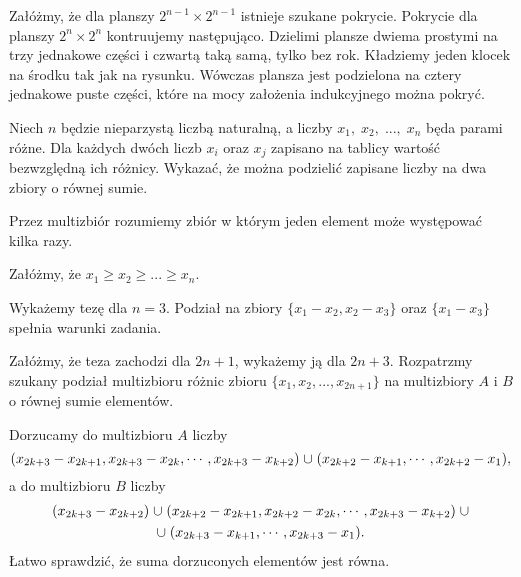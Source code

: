 Załóżmy, że dla planszy $2^{n - 1} \times 2^{n - 1}$ istnieje szukane pokrycie. Pokrycie dla planszy $2^{n} \times 2^{n}$ kontruujemy następująco. Dzielimi plansze dwiema prostymi na trzy jednakowe części i czwartą taką samą, tylko bez rok. Kładziemy jeden klocek na środku tak jak na rysunku. Wówczas plansza jest podzielona na cztery jednakowe puste części, które na mocy założenia indukcyjnego można pokryć.

\begin{problem}{7}
Niech $n$ będzie nieparzystą liczbą naturalną, a liczby $x_1,\; x_2,\; ...,\; x_n$ będa parami różne. Dla każdych dwóch liczb $x_i$ oraz $x_j$ zapisano na tablicy wartość bezwzględną ich różnicy. Wykazać, że można podzielić zapisane liczby na dwa zbiory o równej sumie.
\end{problem}
Przez multizbiór rozumiemy zbiór w którym jeden element może występować kilka razy.

Załóżmy, że $x_1 \geqslant x_2 \geqslant ... \geqslant x_n$. 

Wykażemy tezę dla $n = 3$. Podział na zbiory $\{x_1 - x_2, x_2 - x_3\}$ oraz $\{x_1 - x_3\}$ spełnia warunki zadania.

Załóżmy, że teza zachodzi dla $2n + 1$, wykażemy ją dla $2n + 3$.
Rozpatrzmy szukany podział multizbioru różnic zbioru $\{x_1, x_2, ..., x_{2n + 1}\}$ na multizbiory $A$ i $B$ o równej sumie elementów.

Dorzucamy do multizbioru $A$ liczby
\[
	({x_{2k+3}-x_{2k+1},x_{2k+3}-x_{2k},\cdots,x_{2k+3}-x_{k+2}}) \thickspace {\cup}\thickspace ({x_{2k+2}-x_{k+1},\cdots,x_{2k+2}-x_1}),
\]
a do multizbioru $B$ liczby
\begin{gather*}
	(x_{2k+3} - x_{2k+2}) \thickspace {\cup}\thickspace ({x_{2k+2} - x_{2k+1}, x_{2k+2} - x_{2k}, \cdots, x_{2k+3} - x_{k+2}}) \thickspace {\cup} \\ {\cup} \thickspace({x_{2k+3}-x_{k+1},\cdots,x_{2k+3}-x_1}).
\end{gather*}
Łatwo sprawdzić, że suma dorzuconych elementów jest równa.